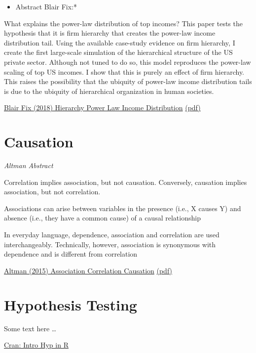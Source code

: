 \documentclass[
]{book}
\providecommand{\tightlist}{%
  \setlength{\itemsep}{0pt}\setlength{\parskip}{0pt}}
\begin{document}
\begin{itemize}
\tightlist
\item
  Abstract Blair Fix:*
\end{itemize}

What explains the power-law distribution of top incomes? This paper tests the
hypothesis that it is firm hierarchy that creates the power-law income distribution tail.
Using the available case-study evidence on firm hierarchy, I create the
first large-scale simulation of the hierarchical structure of the US private sector.
Although not tuned to do so, this model reproduces the power-law scaling of
top US incomes. I show that this is purely an effect of firm hierarchy. This raises
the possibility that the ubiquity of power-law income distribution tails is due to
the ubiquity of hierarchical organization in human societies.

\href{https://osf.io/u95dk/}{Blair Fix (2018) Hierarchy Power Law Income Distribution}
\href{pdf/Blair_Fix_2018_Hierarchy_Power_law.pdf}{(pdf)}

\hypertarget{causation}{%
\chapter{Causation}\label{causation}}

\emph{Altman Abstract}

Correlation implies association, but not causation.
Conversely, causation implies association, but not correlation.

Associations can arise between variables in the presence (i.e., X causes Y) and
absence (i.e., they have a common cause) of a causal relationship

In everyday language, dependence, association and correlation are used interchangeably. Technically, however, association is synonymous with dependence and is different from correlation

\href{https://www.nature.com/articles/nmeth.3587}{Altman (2015) Association Correlation Causation}
\href{pdf/Altman_2015_Association_Correlation_and_Causation.pdf}{(pdf)}

\hypertarget{hypothesis-testing}{%
\chapter{Hypothesis Testing}\label{hypothesis-testing}}

Some text here \ldots{}

\href{https://cran.r-project.org/web/packages/distributions3/vignettes/intro-to-hypothesis-testing.html}{Cran: Intro Hyp in R}
\end{document}
